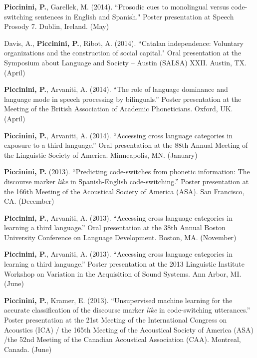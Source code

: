 \documentclass[9pt]{article}
\newenvironment{changemargin}[2]{%
  \begin{list}{}{%
    \setlength{\topsep}{0pt}%
    \setlength{\leftmargin}{#1}%
    \setlength{\rightmargin}{#2}%
    \setlength{\listparindent}{\parindent}%
    \setlength{\itemindent}{\parindent}%
    \setlength{\parsep}{\parskip}%
  }%
  \item[]}{\end{list}
}
\newenvironment{body} {
	\vspace*{-16pt}
	\begin{changemargin}{-0.25in}{-0.5in}
  }	
	{\end{changemargin}
}
\begin{document}
\begin{body}
	\textbf{Piccinini, P.}, Garellek, M. (2014). ``Prosodic cues to monolingual versus code-switching sentences in English and Spanish." Poster presentation at Speech Prosody 7. Dublin, Ireland. (May)\\
	\medskip
	
	Davis, A., \textbf{Piccinini, P.}, Ribot, A. (2014). ``Catalan independence: Voluntary organizations and the construction of social capital." Oral presentation at the Symposium about Language and Society -- Austin (SALSA) XXII. Austin, TX. (April)\\
	\medskip
	
	\textbf{Piccinini, P.}, Arvaniti, A. (2014). ``The role of language dominance and language mode in speech processing by bilinguals.'' Poster presentation at the Meeting of the British Association of Academic Phoneticians. Oxford, UK. (April)\\
	\medskip

	\textbf{Piccinini, P.}, Arvaniti, A. (2014). ``Accessing cross language categories in exposure to a third language.'' Oral presentation at the 88th Annual Meeting of the Linguistic Society of America. Minneapolis, MN. (January)\\
	\medskip

	\textbf{Piccinini, P.} (2013). ``Predicting code-switches from phonetic information: The discourse marker \emph{like} in Spanish-English code-switching.'' Poster presentation at the 166th Meeting of the Acoustical Society of America (ASA). San Francisco, CA. (December)\\
	\medskip	

	\textbf{Piccinini, P.}, Arvaniti, A. (2013). ``Accessing cross language categories in learning a third language.'' Oral presentation at the 38th Annual Boston University Conference on Language Development. Boston, MA. (November)\\
	\medskip

	\textbf{Piccinini, P.}, Arvaniti, A. (2013). ``Accessing cross language categories in learning a third language.'' Poster presentation at the 2013 Linguistic Institute Workshop on Variation in the Acquisition of Sound Systems. Ann Arbor, MI. (June)\\
	\medskip
	
	\textbf{Piccinini, P.}, Kramer, E. (2013). ``Unsupervised machine learning for the accurate classification of the discourse marker \emph{like} in code-switching utterances.'' Poster presentation at the 21st Meeting of the International Congress on Acoustics (ICA) / the 165th Meeting of the Acoustical Society of America (ASA) /the 52nd Meeting of the Canadian Acoustical Association (CAA). Montreal, Canada. (June)\\
	\medskip
		

\end{body}
\end{document}
